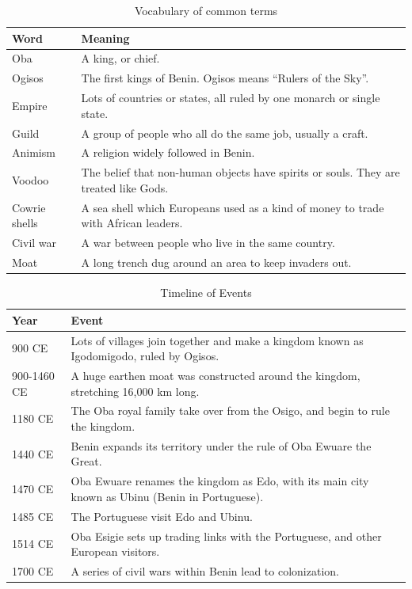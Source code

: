 \begin{table}[htb]
\centering
\caption{Vocabulary of common terms}
\label{tab:vocabulary}
\begin{tabularx}{\linewidth}{|l|X|}
\hline
\textbf{Word} & \textbf{Meaning} \\
\hline
Oba & A king, or chief. \\
\hline
Ogisos & The first kings of Benin. Ogisos means “Rulers of the Sky”. \\
\hline
Empire & Lots of countries or states, all ruled by one monarch or single state. \\
\hline
Guild & A group of people who all do the same job, usually a craft. \\
\hline
Animism & A religion widely followed in Benin. \\
\hline
Voodoo & The belief that non-human objects have spirits or souls. They are treated like Gods. \\
\hline
Cowrie shells & A sea shell which Europeans used as a kind of money to trade with African leaders. \\
\hline
Civil war & A war between people who live in the same country. \\
\hline
Moat & A long trench dug around an area to keep invaders out. \\
\hline
\end{tabularx}
\end{table}

\begin{table}[htb]
\centering
\caption{Timeline of Events}
\label{tab:timeline}
\begin{tabularx}{\linewidth}{|l|X|}
\hline
\textbf{Year} & \textbf{Event} \\
\hline
900 CE & Lots of villages join together and make a kingdom known as Igodomigodo, ruled by Ogisos. \\
\hline
900-1460 CE & A huge earthen moat was constructed around the kingdom, stretching 16,000 km long. \\
\hline
1180 CE & The Oba royal family take over from the Osigo, and begin to rule the kingdom. \\
\hline
1440 CE & Benin expands its territory under the rule of Oba Ewuare the Great. \\
\hline
1470 CE & Oba Ewuare renames the kingdom as Edo, with its main city known as Ubinu (Benin in Portuguese). \\
\hline
1485 CE & The Portuguese visit Edo and Ubinu. \\
\hline
1514 CE & Oba Esigie sets up trading links with the Portuguese, and other European visitors. \\
\hline
1700 CE & A series of civil wars within Benin lead to colonization. \\
\hline
\end{tabularx}
\end{table}

